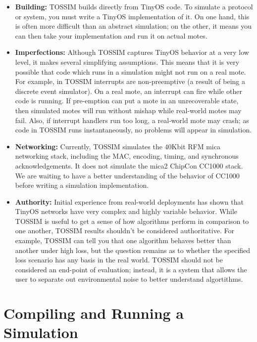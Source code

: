 \documentclass[10pt,fleqn]{article}
\def\sim{TOSSIM\xspace}
\begin{document}
\begin{itemize}
\item{\bf Building:} \sim builds directly from TinyOS code. To simulate
a protocol or system, you must write a TinyOS implementation of it. On
one hand, this is often more difficult than an abstract simulation; on
the other, it means you can then take your implementation and run it
on actual motes.

\item{\bf Imperfections:} Although \sim captures TinyOS
behavior at a very low level, it makes several simplifying
assumptions. This means that it is very possible that code which runs
in a simulation might not run on a real mote. For example, in \sim
interrupts are non-preemptive (a result of being a discrete event
simulator). On a real mote, an interrupt can fire while other code is
running. If pre-emption can put a mote in an unrecoverable state, then
simulated motes will run without mishap while real-world motes may
fail. Also, if interrupt handlers run too long, a real-world mote may
crash; as code in \sim runs instantaneously, no problems will appear
in simulation. 

\item{\bf Networking:} Currently, \sim simulates the 40Kbit RFM mica
networking stack, including the MAC, encoding, timing, and synchronous
acknowledgements. It does not simulate the mica2 ChipCon CC1000 stack.
We are waiting to have a better understanding of the behavior of
CC1000 before writing a simulation implementation.

\item{\bf Authority:} Initial experience from real-world deployments has shown
that TinyOS networks have very complex and highly variable behavior.
While \sim is useful to get a sense of how algorithms perform in
comparison to one another, \sim results shouldn't be considered
authoritative. For example, \sim can tell you that one algorithm
behaves better than another under high loss, but the question remains
as to whether the specified loss scenario has any basis in the real
world. \sim should not be considered an end-point of evaluation;
instead, it is a system that allows the user to separate out
environmental noise to better understand algortithms.

\end{itemize}

\section{Compiling and Running a Simulation}
\end{document}
